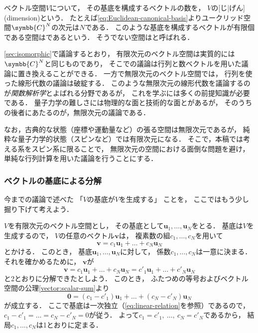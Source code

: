 \documentclass[
]{sotsu}
\begin{document}
ベクトル空間$V$について，
その基底を構成するベクトルの数を，
$V$の[じ|げん](dimension)という．
たとえば\cref{eq:Euclidean-canonical-basis}よりユークリッド空間$\symbb{C}^N$の次元は$N$である．
このような基底を構成するベクトルが有限個である空間はであるという．
そうでない空間はと呼ばれる．

\cref{sec:isomorphic}で議論するとおり，
有限次元のベクトル空間は実質的には$\symbb{C}^N$と同じものであり，
そこでの議論は行列と数ベクトルを用いた議論に置き換えることができる．
一方で無限次元のベクトル空間では，
行列を使った線形代数の議論は破綻する．
このような無限次元の線形代数を議論するのが\emph{関数解析学}とよばれる分野であるが，
これを学ぶには多くの前提知識が必要である．
量子力学の難しさには物理的な面と技術的な面とがあるが，
そのうちの後者にあたるのが，無限次元の議論である．

なお，古典的な状態（座標や運動量など）の張る空間は無限次元であるが，
純粋な量子力学的状態（スピンなど）では有限次元になる．
そこで，本稿では考える系をスピン系に限ることで，
無限次元の空間における面倒な問題を避け，
単純な行列計算を用いた議論を行うことにする．





\subsubsection{ベクトルの基底による分解}
\label{sec:expansion-by-basis}

今までの議論で述べた
「$V$の基底が$V$を生成する」
ことを，
ここではもう少し掘り下げて考えよう．

$V$を有限次元のベクトル空間とし，
その基底として$\symbf{u}_1, \dots, \symbf{u}_N$をとる．
基底は$V$を生成するので，
$V$の任意のベクトル$\symbf{v}$は，
複素数の組$c_1, \dots, c_N$を用いて
\begin{equation*}
    \symbf{v} = c_1 \symbf{u}_1 + \dots + c_N \symbf{u}_N
\end{equation*}
とかける．
このとき，
基底$\symbf{u}_1, \dots, \symbf{u}_N$に対して，
係数$c_1, \dots, c_N$は一意に決まる．
それを確かめるために，
$\symbf{v}$が
\begin{equation*}
    \symbf{v} = c_1  \symbf{u}_1 + \dots + c_N  \symbf{u}_N
              = c'_1 \symbf{u}_1 + \dots + c'_N \symbf{u}_N
\end{equation*}
と2とおりに分解できたとしよう．
このとき，
ふたつめの等号およびベクトル空間の公理\cref{vector:scalar-sum}より
\begin{equation*}
    \symbf{0} = (c_1 - c'_1) \symbf{u}_1 + \dots + (c_N - c'_N) \symbf{u}_N
\end{equation*}
が成立する．
ここで基底は一次独立（\cref{eq:linear-relation}を参照）であるので，
$c_1 - c'_1 = \dots = c_N - c'_N = 0$が従う．
よって$c_1 = c'_1, \  \dots, \  c_N = c'_N$であるから，
結局$c_1, \dots, c_N$は1とおりに定まる．
\end{document}
